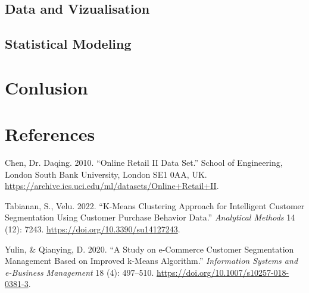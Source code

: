 \documentclass[
]{article}
\newlength{\cslhangindent}
\newlength{\cslentryspacingunit} %
\newenvironment{CSLReferences}[2] %
 {%
  \setlength{\parindent}{0pt}
  \ifodd #1
  \let\oldpar\par
  \def\par{\hangindent=\cslhangindent\oldpar}
  \fi
  \setlength{\parskip}{#2\cslentryspacingunit}
 }%
 {}
\begin{document}
\hypertarget{data-and-vizualisation}{%
\subsection{Data and Vizualisation}\label{data-and-vizualisation}}

\hypertarget{statistical-modeling}{%
\subsection{Statistical Modeling}\label{statistical-modeling}}

\hypertarget{conlusion}{%
\section{Conlusion}\label{conlusion}}

\hypertarget{references}{%
\section*{References}\label{references}}

\hypertarget{refs}{}
\begin{CSLReferences}{1}{0}
\leavevmode{}%
Chen, Dr. Daqing. 2010. {``Online Retail II Data Set.''} School of
Engineering, London South Bank University, London SE1 0AA, UK.
\url{https://archive.ics.uci.edu/ml/datasets/Online+Retail+II}.

\leavevmode{}%
Tabianan, S., Velu. 2022. {``K-Means Clustering Approach for Intelligent
Customer Segmentation Using Customer Purchase Behavior Data.''}
\emph{Analytical Methods} 14 (12): 7243.
\url{https://doi.org/10.3390/su14127243}.

\leavevmode{}%
Yulin, \& Qianying, D. 2020. {``A Study on e-Commerce Customer
Segmentation Management Based on Improved k-Means Algorithm.''}
\emph{Information Systems and e-Business Management} 18 (4): 497--510.
\url{https://doi.org/10.1007/s10257-018-0381-3}.

\end{CSLReferences}
\end{document}
